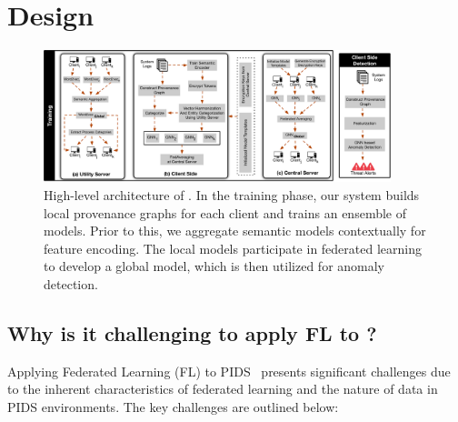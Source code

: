 \section{Design}
\label{sec:methodology}



\begin{figure}[t!]
  \centering
  \includegraphics[width=0.90\textwidth]{fig/archv3.pdf}
  \caption{High-level architecture of \Sys. In the training phase, our system builds local provenance graphs for each client and trains an ensemble of \gnnshort models. Prior to this, we aggregate semantic models contextually for feature encoding. The local \gnnshort models participate in federated learning to develop a global \gnnshort model, which is then utilized for anomaly detection. }
  \vspace{-3ex}
  \label{fig:arch}
\end{figure}


\subsection{Why is it challenging to apply FL to \pids?}


Applying Federated Learning (FL) to PIDS~\cite{streamspot,provdetector2020,wang2022threatrace,shadewatcher,yangprographer,han2020unicorn,jia2023magic,flash2024,cheng2023kairos,sigl} presents significant challenges due to the inherent characteristics of federated learning and the nature of data in PIDS environments. The key challenges are outlined below:

